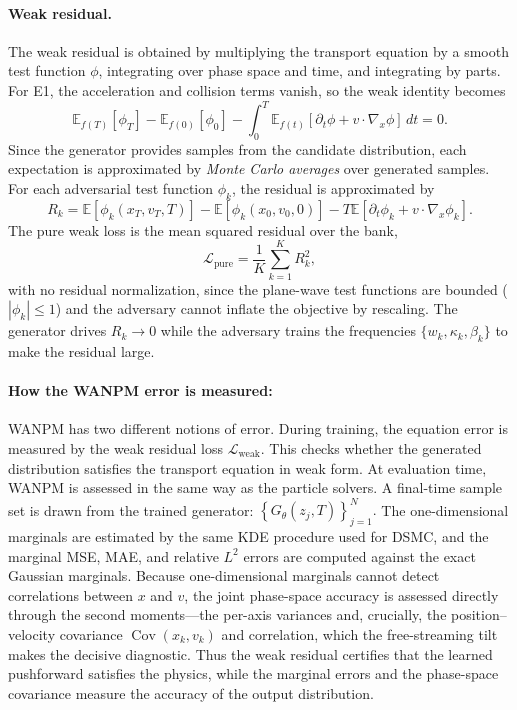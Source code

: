 \documentclass[11pt]{article}
\theoremstyle{plain}
\begin{document}
\paragraph{Weak residual.}
The weak residual is obtained by multiplying the transport equation by a smooth test function \(\phi\), integrating over phase space and time, and integrating by parts. For E1, the acceleration and collision terms vanish, so the weak identity becomes
\begin{equation}
\mathbb E_{f(T)}[\phi_T]
-
\mathbb E_{f(0)}[\phi_0]
-
\int_0^T
\mathbb E_{f(t)}
\left[
\partial_t\phi+v\cdot\nabla_x\phi
\right]
\,dt
=
0.
\label{eq:wanpm_weak_identity_e1}
\end{equation}
Since the generator provides samples from the candidate distribution, each expectation is approximated by \textit{Monte Carlo averages} over generated samples. For each adversarial test function \(\phi_k\), the residual is approximated by
\begin{equation}
R_k
=
\mathbb E[\phi_k(x_T,v_T,T)]
-
\mathbb E[\phi_k(x_0,v_0,0)]
-
T\mathbb E
\left[
\partial_t\phi_k
+
v\cdot\nabla_x\phi_k
\right].
\label{eq:wanpm_residual}
\end{equation}
The pure weak loss is the mean squared residual over the bank,
\begin{equation}
\mathcal L_{\mathrm{pure}}
=
\frac{1}{K}
\sum_{k=1}^{K}
R_k^2,
\label{eq:wanpm_weak_loss}
\end{equation}
with no residual normalization, since the plane-wave test functions are bounded ($|\phi_k|\le1$) and the adversary
cannot inflate the objective by rescaling. The generator drives \(R_k\to 0\) while the adversary trains the
frequencies $\{w_k,\kappa_k,\beta_k\}$ to make the residual large.




\paragraph{How  the WANPM error is measured:}

WANPM has two different notions of error. During training, the equation error is measured by the weak residual loss \(\mathcal L_{\mathrm{weak}}\). This checks whether the generated distribution satisfies the transport equation in weak form. At evaluation time, WANPM is assessed in the same way as the particle solvers. A final-time sample set is drawn from the trained generator: $\left\{
G_\theta(z_j,T)
\right\}_{j=1}^{N}.$
The one-dimensional marginals are estimated by the same KDE procedure used for DSMC, and the marginal MSE, MAE, and relative \(L^2\) errors are computed against the exact Gaussian marginals. Because one-dimensional marginals cannot detect correlations between \(x\) and \(v\), the joint phase-space accuracy is assessed directly through the second moments---the per-axis variances and, crucially, the position--velocity covariance \(\operatorname{Cov}(x_k,v_k)\) and correlation, which the free-streaming tilt makes the decisive diagnostic. Thus the weak residual certifies that the learned pushforward satisfies the physics, while the marginal errors and the phase-space covariance measure the accuracy of the output distribution.
\end{document}

